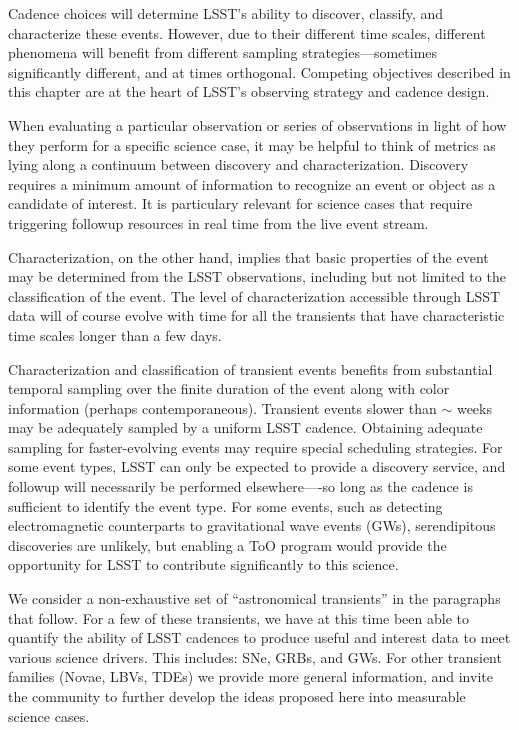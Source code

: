 Cadence choices will determine LSST's ability to discover, classify, and
characterize these events. However, due to their different time scales, 
different phenomena will benefit from different sampling 
strategies---sometimes
significantly different, and at times orthogonal.  Competing objectives
described in this chapter are at the heart of LSST's observing strategy and
cadence design.

When evaluating a particular observation or series of observations in
light of how they perform for a specific science case, it may be
helpful to think of metrics as lying along a continuum between
discovery and characterization. Discovery requires a minimum amount of
information to recognize an event or object as a candidate of
interest.  It is particulary relevant for science cases that require
triggering followup resources in real time from the live event stream.

Characterization, on the other hand, implies
that basic properties of the event may be determined from the
LSST observations, including but not limited to the classification of
the event. The level of characterization accessible through LSST data
will of course evolve with time for all the transients that have
characteristic time scales longer than a few days.

Characterization and classification of transient events 
benefits from substantial temporal sampling over the finite duration of the
event along with color information (perhaps contemporaneous). 
Transient events slower than $\sim$ weeks may be adequately sampled by
a uniform LSST cadence.  Obtaining adequate sampling for faster-evolving
events may require special scheduling
strategies.  For some event types, LSST can only be expected to
provide a discovery service, and followup will necessarily be
performed elsewhere----so long as the cadence is sufficient to identify the
event type.
For some events, such as detecting electromagnetic counterparts to
gravitational wave events (GWs),
serendipitous discoveries are unlikely, but
enabling a ToO program would provide the opportunity for LSST to
contribute significantly to this science.


We consider a non-exhaustive set of ``astronomical transients'' in the
paragraphs that follow. For a few of these transients, we have at this time been able to quantify the ability of LSST cadences to produce useful and interest data to meet various science drivers. This includes: SNe, GRBs, and GWs. For other transient families (Novae, LBVs, TDEs) we provide more general information, and invite the community to further develop the ideas proposed here into measurable science cases. 

